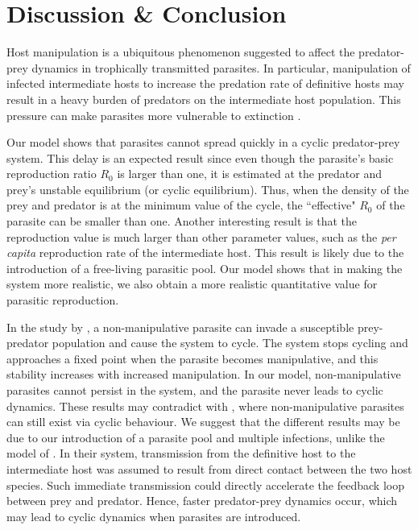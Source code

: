 \documentclass[a4paper]{scrartcl}
\begin{document}
\section*{Discussion \& Conclusion}
Host manipulation is a ubiquitous phenomenon suggested to affect the predator-prey dynamics in trophically transmitted parasites. 
In particular, manipulation of infected intermediate hosts to increase the predation rate of definitive hosts may result in a heavy burden of predators on the intermediate host population.
This pressure can make parasites more vulnerable to extinction \citep{Hadeler1989,Fenton2006}. 

Our model shows that parasites cannot spread quickly in a cyclic predator-prey system. 
This delay is an expected result since even though the parasite's basic reproduction ratio $R_0$ is larger than one, it is estimated at the predator and prey's unstable equilibrium (or cyclic equilibrium). 
Thus, when the density of the prey and predator is at the minimum value of the cycle, the ``effective" $R_0$ of the parasite can be smaller than one. 
Another interesting result is that the reproduction value is much larger than other parameter values, such as the \textit{per capita} reproduction rate of the intermediate host.
This result is likely due to the introduction of a free-living parasitic pool. Our model shows that in making the system more realistic, we also obtain a more realistic quantitative value for parasitic reproduction.

In the study by \cite{Rogawa2018}, a non-manipulative parasite can invade a susceptible prey-predator population and cause the system to cycle. 
The system stops cycling and approaches a fixed point when the parasite becomes manipulative, and this stability increases with increased manipulation.
In our model, non-manipulative parasites cannot persist in the system, and the parasite never leads to cyclic dynamics. 
These results may contradict with \cite{Rogawa2018}, where non-manipulative parasites can still exist via cyclic behaviour. 
We suggest that the different results may be due to our introduction of a parasite pool and multiple infections, unlike the model of \cite{Rogawa2018}. 
In their system, transmission from the definitive host to the intermediate host was assumed to result from direct contact between the two host species. 
Such immediate transmission could directly accelerate the feedback loop between prey and predator. 
Hence, faster predator-prey dynamics occur, which may lead to cyclic dynamics when parasites are introduced.
\end{document}
